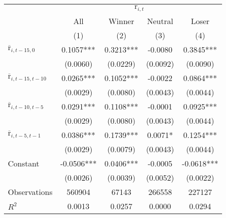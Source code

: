 \begin{tabular}{lcccc}
\toprule
 & \multicolumn{4}{c}{$\text{r}_{i,t}$} \\
\cmidrule{2-5}
 & All & Winner & Neutral & Loser\\
 & (1) & (2) & (3) & (4) \\
\midrule
$\overline{\text{r}}_{i,t-15,0}$ & 0.1057*** & 0.3213*** & -0.0080 & 0.3845*** \\
 & (0.0060) & (0.0229) & (0.0092) & (0.0090) \\
$\overline{\text{r}}_{i,t-15,t-10}$ & 0.0265*** & 0.1052*** & -0.0022 & 0.0864*** \\
 & (0.0029) & (0.0080) & (0.0043) & (0.0044) \\
$\overline{\text{r}}_{i,t-10,t-5}$ & 0.0291*** & 0.1108*** & -0.0001 & 0.0925*** \\
 & (0.0029) & (0.0080) & (0.0043) & (0.0044) \\
$\overline{\text{r}}_{i,t-5,t-1}$ & 0.0386*** & 0.1739*** & 0.0071* & 0.1254*** \\
 & (0.0029) & (0.0079) & (0.0043) & (0.0044) \\
Constant & -0.0506*** & 0.0406*** & -0.0005 & -0.0618*** \\
 & (0.0026) & (0.0039) & (0.0052) & (0.0022) \\
\midrule
Observations & 560904 & 67143 & 266558 & 227127 \\
$R^2$ & 0.0013 & 0.0257 & 0.0000 & 0.0294 \\
\bottomrule
\end{tabular}